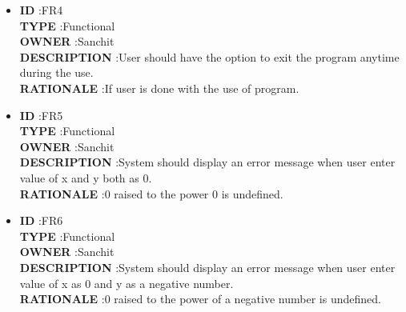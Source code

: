 \documentclass[a4paper,12pt]{article}
\begin{document}
\begin{itemize}
	
	\item \textbf{ID } \hspace{3cm} :FR4  \\
	\textbf{TYPE } \hspace{2.27cm}  :Functional\\
	\textbf{OWNER } \hspace{1.75cm} :Sanchit \\
	\textbf{DESCRIPTION }\hspace{0.35cm} :User should have the option to exit the program anytime during the use. \\
	\textbf{RATIONALE } \hspace{0.75cm} :If user is done with the use of program.  \\
	
	
	\item \textbf{ID } \hspace{3cm} :FR5  \\
	\textbf{TYPE } \hspace{2.27cm}  :Functional\\
	\textbf{OWNER } \hspace{1.75cm} :Sanchit \\
	\textbf{DESCRIPTION }\hspace{0.35cm} :System should display an error message when user enter value of x and y both as 0. \\
	\textbf{RATIONALE } \hspace{0.75cm} :0 raised to the power 0 is undefined.  \\
	
	
	\item \textbf{ID } \hspace{3cm} :FR6  \\
	\textbf{TYPE } \hspace{2.27cm}  :Functional\\
	\textbf{OWNER } \hspace{1.75cm} :Sanchit \\
	\textbf{DESCRIPTION }\hspace{0.35cm} :System should display an error message when user enter value of x as 0 and y as a negative number. \\
	\textbf{RATIONALE } \hspace{0.75cm} :0 raised to the power of a negative number is undefined.  \\
	

\end{itemize}
\end{document}
